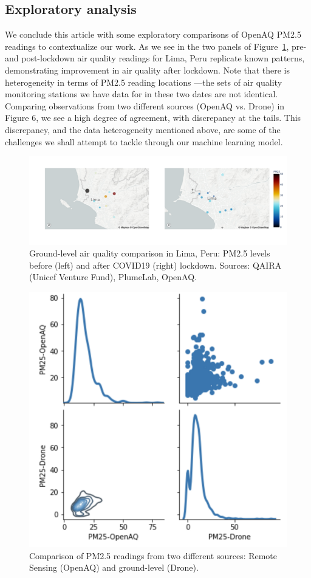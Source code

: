 \subsection{Exploratory analysis}
We conclude this article with some exploratory comparisons of OpenAQ PM2.5 readings to contextualize our work. As we see in the two panels of Figure~\ref{fig:limamap}, pre-and post-lockdown air quality readings for Lima, Peru replicate known patterns, demonstrating improvement in air quality after lockdown. Note that there is heterogeneity in terms of PM2.5 reading locations —the sets of air quality monitoring stations we have data for in these two dates are not identical. Comparing observations from two different sources (OpenAQ vs. Drone) in Figure 6, we see a high degree of agreement, with discrepancy at the tails. This discrepancy, and the data heterogeneity mentioned above, are some of the challenges we shall attempt to tackle through our machine learning model.

\begin{figure}[t]
    \centering
    \includegraphics[width=.8\textwidth]{limamap.png}
    \caption{Ground-level air quality comparison in Lima, Peru: PM2.5 levels before (left) and after COVID19 (right) lockdown. Sources: QAIRA (Unicef Venture Fund), PlumeLab, OpenAQ.}
    \label{fig:limamap}
\end{figure}

\begin{figure}[t]
    \centering
    \includegraphics[width=.8\linewidth]{pmsummary.png}
    \caption{Comparison of PM2.5 readings from two different sources: Remote Sensing (OpenAQ) and ground-level (Drone).}
    \label{fig:summary}
\end{figure}

